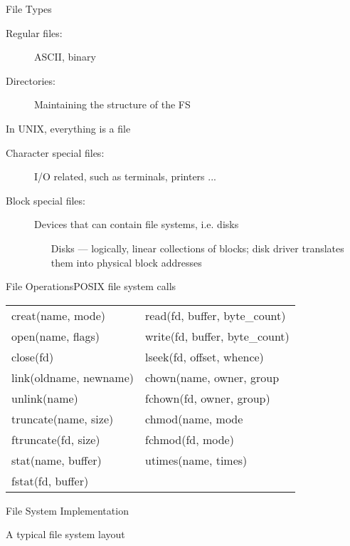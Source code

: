 \begin{frame}{File Types}
  \begin{description}
  \item[Regular files:] ASCII, binary
  \item[Directories:] Maintaining the structure of the FS
  \end{description}
  \begin{block}{In UNIX, everything is a file}
    \begin{description}
    \item[Character special files:] I/O related, such as terminals, printers ...
    \item[Block special files:] Devices that can contain file systems, i.e. disks
      \begin{itemize}
      \item[Disks] --- logically, linear collections of blocks; disk driver translates
        them into physical block addresses
      \end{itemize}
    \end{description}
  \end{block}
\end{frame}

\begin{frame}{File Operations}{POSIX file system calls}%
  \begin{tabular}{>{\ttfamily}l|>{\ttfamily}l}
    creat(name, mode)&read(fd, buffer, byte\_count)\\
    open(name, flags)&write(fd, buffer, byte\_count)\\
    close(fd)&lseek(fd, offset, whence)\\
    link(oldname, newname)&chown(name, owner, group\\
    unlink(name)&fchown(fd, owner, group)\\        
    truncate(name, size)&chmod(name, mode\\
    ftruncate(fd, size)&fchmod(fd, mode)\\
    stat(name, buffer)&utimes(name, times)\\
    fstat(fd, buffer)&\\
  \end{tabular}
\end{frame}

\begin{frame}{File System Implementation}
  \begin{block}{A typical file system layout}
    \begin{center}
    \end{center}
  \end{block}
  \begin{center}
  \end{center}
\end{frame}

